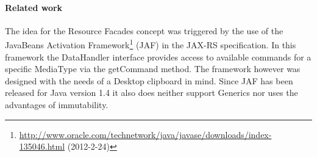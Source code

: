 \documentclass[12pt,a4paper,twoside]{scrartcl}		%
\newcommand{\citeurl}[2]{\url{#1} (#2)}
\begin{document}




\paragraph{Related work}
\label{sec:resourcefacadesrelated-work}

The idea for the Resource Facades concept was triggered by the use of the
JavaBeans Activation
Framework\footnote{\citeurl{http://www.oracle.com/technetwork/java/javase/downloads/index-135046.html}{2012-2-24}}
(JAF) in the JAX-RS specification. In this framework the DataHandler interface
provides access to available commands for a specific MediaType via the
getCommand method. The framework however was designed with the needs of a
Desktop clipboard in mind. Since JAF has been released for Java version 1.4 it
also does neither support Generics nor uses the advantages of immutability.
\end{document}
